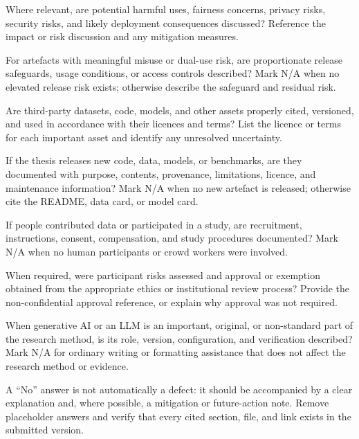 \begin{reproducibilitychecklist}
{Where relevant, are potential harmful uses, fairness concerns, privacy risks,
security risks, and likely deployment consequences discussed?}
{Reference the impact or risk discussion and any mitigation measures.}

{For artefacts with meaningful misuse or dual-use risk, are proportionate
release safeguards, usage conditions, or access controls described?}
{Mark N/A when no elevated release risk exists; otherwise describe the safeguard and residual risk.}

{Are third-party datasets, code, models, and other assets properly cited, versioned,
and used in accordance with their licences and terms?}
{List the licence or terms for each important asset and identify any unresolved uncertainty.}

{If the thesis releases new code, data, models, or benchmarks, are they documented
with purpose, contents, provenance, limitations, licence, and maintenance information?}
{Mark N/A when no new artefact is released; otherwise cite the README, data card, or model card.}

{If people contributed data or participated in a study, are recruitment,
instructions, consent, compensation, and study procedures documented?}
{Mark N/A when no human participants or crowd workers were involved.}

{When required, were participant risks assessed and approval or exemption
obtained from the appropriate ethics or institutional review process?}
{Provide the non-confidential approval reference, or explain why approval was not required.}

{When generative AI or an LLM is an important, original, or non-standard part of
the research method, is its role, version, configuration, and verification described?}
{Mark N/A for ordinary writing or formatting assistance that does not affect the research method or evidence.}

\end{reproducibilitychecklist}

\begin{keypoint}
A ``No'' answer is not automatically a defect: it should be accompanied by a
clear explanation and, where possible, a mitigation or future-action note.
Remove placeholder answers and verify that every cited section, file, and link
exists in the submitted version.
\end{keypoint}
